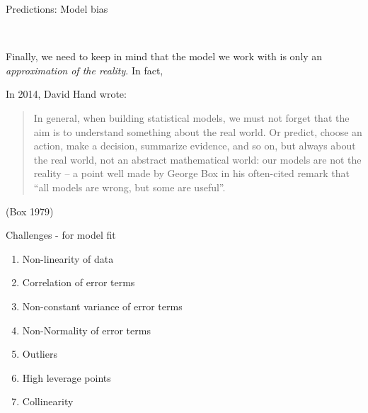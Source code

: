 \documentclass[10pt,ignorenonframetext,]{beamer}
\providecommand{\tightlist}{%
  \setlength{\itemsep}{0pt}\setlength{\parskip}{0pt}}
\begin{document}
\begin{frame}

\begin{block}{Predictions: Model bias}

\(~\)

Finally, we need to keep in mind that the model we work with is only an
\emph{approximation of the reality}. In fact,

\vspace{4mm}

In 2014, David Hand wrote:

\vspace{4mm}

\begin{quote}
In general, when building statistical models, we must
not forget that the aim is to understand something about
the real world. Or predict, choose an action, make
a decision, summarize evidence, and so on, but always
about the real world, not an abstract mathematical
world: our models are not the reality -- a point well
made by George Box in his often-cited remark that
``all models are wrong, but some are useful''.
\end{quote}

(Box 1979)

\end{block}

\end{frame}

\begin{frame}

\begin{block}{Challenges - for model fit}

\begin{enumerate}
\def\labelenumi{\arabic{enumi}.}
\tightlist
\item
  Non-linearity of data
\item
  Correlation of error terms
\item
  Non-constant variance of error terms
\item
  Non-Normality of error terms
\item
  Outliers
\item
  High leverage points
\item
  Collinearity
\end{enumerate}

\end{block}

\end{frame}
\end{document}
